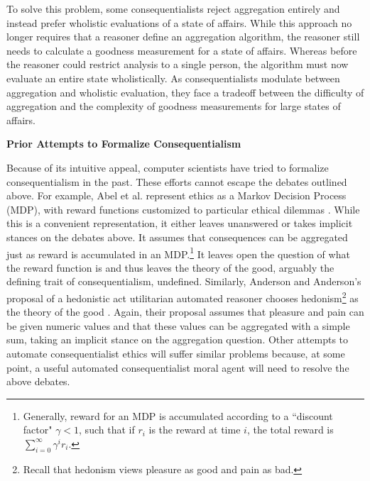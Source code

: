 \begin{isabellebody}
\begin{isamarkuptext}
To solve this problem, some consequentialists reject aggregation entirely and instead prefer wholistic
evaluations of a state of affairs. While this approach no longer requires that a reasoner define an 
aggregation algorithm, the reasoner still needs to calculate a goodness measurement for a state of 
affairs. Whereas before the reasoner could restrict analysis to a single person, the algorithm must now 
evaluate an entire state wholistically. As consequentialists modulate between aggregation 
and wholistic evaluation, they face a tradeoff between the difficulty of aggregation and the complexity 
of goodness measurements for large states of affairs.%
\end{isamarkuptext}\isamarkuptrue%
%
\begin{isamarkuptext}%
\noindent \textbf{Prior Attempts to Formalize Consequentialism}%
\end{isamarkuptext}\isamarkuptrue%
%
\begin{isamarkuptext}%
Because of its intuitive appeal, computer scientists have tried to formalize consequentialism in the past.
These efforts cannot escape the debates outlined above. For example, Abel et al. represent ethics as a
Markov Decision Process (MDP), with reward functions customized to particular ethical dilemmas 
\citep[3]{util1}. While this is a convenient representation, it either leaves unanswered or 
takes implicit stances on the debates above. It assumes that consequences can be aggregated just as 
reward is accumulated in an MDP.\footnote{Generally, reward for an MDP is accumulated according to a 
``discount factor" $\gamma < 1$, such that if $r_i$ is the reward at time $i$, the total reward is $\sum_{i=0}^{\infty}\gamma^i r_i$.} 
It leaves open the question of what the reward function is and thus 
leaves the theory of the good, arguably the defining trait of consequentialism, 
undefined. Similarly, Anderson and Anderson's proposal of a hedonistic act 
utilitarian automated reasoner chooses hedonism\footnote{Recall that hedonism views pleasure as good
and pain as bad.} as the theory of the good \citep[2]{util2}. Again, their proposal assumes that pleasure and pain can be 
given numeric values and that these values can be aggregated with a simple sum, taking an implicit
stance on the aggregation question. Other attempts to automate consequentialist ethics will suffer 
similar problems because, at some point, a useful automated consequentialist moral agent will need 
to resolve the above debates.%
\end{isamarkuptext}\isamarkuptrue%
%

\end{isabellebody}

